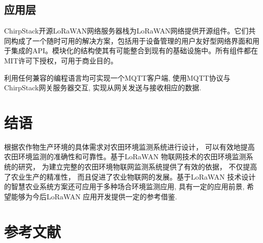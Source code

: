 \documentclass[scheme=chinese,a4paper]{article}
\begin{document}
\subsection{应用层}
ChirpStack开源LoRaWAN网络服务器栈为LoRaWAN网络提供开源组件。它们共同构成了一个随时可用的解决方案，包括用于设备管理的用户友好型网络界面和用于集成的API。模块化的结构使其有可能整合到现有的基础设施中。所有组件都在MIT许可下授权，可用于商业目的。

利用任何兼容的编程语言均可实现一个MQTT客户端, 使用MQTT协议与ChirpStack网关服务器交互, 实现从网关发送与接收相应的数据. 

\section{结语}
根据农作物生产环境的具体需求对农田环境监测系统进行设计， 可以有效地提高农田环境监测的准确性和可靠性。基于LoRaWAN 物联网技术的农田环境监测系统的研究， 为建立完整的农田环境物联网监测系统提供了有效的依据， 不仅提高了农业生产的精准性， 而且促进了农业物联网的发展。基于LoRaWAN 技术设计的智慧农业系统方案还可应用于多种场合环境监测应用, 具有一定的应用前景, 希望能够为今后LoRaWAN 应用开发提供一定的参考借鉴.
\section{参考文献}
\printbibliography[heading=none]
\end{document}
